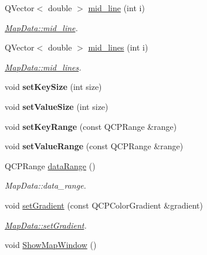 \begin{DoxyCompactItemize}
\item 
Q\+Vector$<$ double $>$ \hyperlink{class_map_data_a1abf4b8f0c1cb51017e6dfffd0e4ff99}{mid\+\_\+line} (int i)
\begin{DoxyCompactList}\small\item\em \hyperlink{class_map_data_a1abf4b8f0c1cb51017e6dfffd0e4ff99}{Map\+Data\+::mid\+\_\+line}. \end{DoxyCompactList}\item 
Q\+Vector$<$ double $>$ \hyperlink{class_map_data_a95f9011ac33e065d58f2bf26b0db9580}{mid\+\_\+lines} (int i)
\begin{DoxyCompactList}\small\item\em \hyperlink{class_map_data_a95f9011ac33e065d58f2bf26b0db9580}{Map\+Data\+::mid\+\_\+lines}. \end{DoxyCompactList}\item 
\hypertarget{class_map_data_a4449d591b36835bfc33e4d4f18a5440f}{void {\bfseries set\+Key\+Size} (int size)}\label{class_map_data_a4449d591b36835bfc33e4d4f18a5440f}

\item 
\hypertarget{class_map_data_a012b63962abf29178802dae20c40d4b8}{void {\bfseries set\+Value\+Size} (int size)}\label{class_map_data_a012b63962abf29178802dae20c40d4b8}

\item 
\hypertarget{class_map_data_a285fff0a4f3362a155df80e0c61bdc45}{void {\bfseries set\+Key\+Range} (const Q\+C\+P\+Range \&range)}\label{class_map_data_a285fff0a4f3362a155df80e0c61bdc45}

\item 
\hypertarget{class_map_data_a90916d2acda22cd75c03f1daf9481e56}{void {\bfseries set\+Value\+Range} (const Q\+C\+P\+Range \&range)}\label{class_map_data_a90916d2acda22cd75c03f1daf9481e56}

\item 
Q\+C\+P\+Range \hyperlink{class_map_data_aab56283cdcdbc2d122a6a4a6d0da0eb7}{data\+Range} ()
\begin{DoxyCompactList}\small\item\em Map\+Data\+::data\+\_\+range. \end{DoxyCompactList}\item 
void \hyperlink{class_map_data_ad9e7fbe1bbb0f16b52eb71e0c7da4fb6}{set\+Gradient} (const Q\+C\+P\+Color\+Gradient \&gradient)
\begin{DoxyCompactList}\small\item\em \hyperlink{class_map_data_ad9e7fbe1bbb0f16b52eb71e0c7da4fb6}{Map\+Data\+::set\+Gradient}. \end{DoxyCompactList}\item 
\hypertarget{class_map_data_ad93b4a05e79ca14e075d7991fce4b5cd}{void \hyperlink{class_map_data_ad93b4a05e79ca14e075d7991fce4b5cd}{Show\+Map\+Window} ()}\label{class_map_data_ad93b4a05e79ca14e075d7991fce4b5cd}


\end{DoxyCompactItemize}
